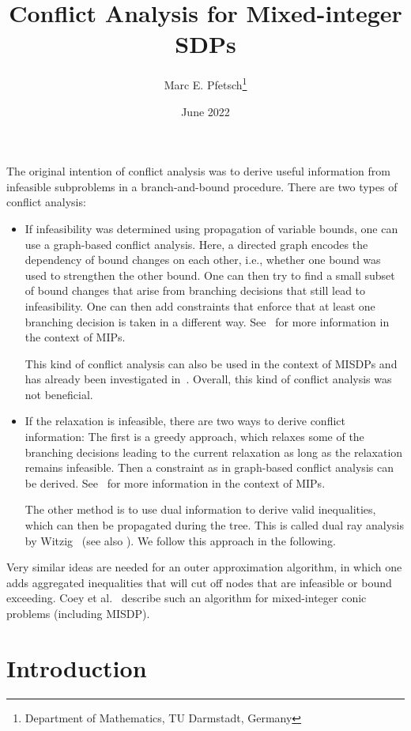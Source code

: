 \documentclass[10pt, a4paper]{article}
\title{Conflict Analysis for Mixed-integer SDPs}
\author{Marc E. Pfetsch\thanks{Department of Mathematics, TU Darmstadt, Germany}}
\date{June 2022}
\begin{document}
\maketitle

The original intention of conflict analysis was to derive useful
information from infeasible subproblems in a branch-and-bound
procedure. There are two types of conflict analysis:
\begin{itemize}
\item If infeasibility was determined using propagation of variable bounds,
  one can use a graph-based conflict analysis. Here, a directed graph
  encodes the dependency of bound changes on each other, i.e., whether one
  bound was used to strengthen the other bound. One can then try to find a
  small subset of bound changes that arise from branching decisions that
  still lead to infeasibility. One can then add constraints that enforce
  that at least one branching decision is taken in a different
  way. See~\cite{Ach07b,Ach07} for more information in the context of MIPs.

  This kind of conflict analysis can also be used in the context of MISDPs
  and has already been investigated in~\cite{MatP22}. Overall, this kind of
  conflict analysis was not beneficial.
\item If the relaxation is infeasible, there are two ways to derive
  conflict information: The first is a greedy approach, which relaxes some
  of the branching decisions leading to the current relaxation as long as
  the relaxation remains infeasible. Then a constraint as in graph-based
  conflict analysis can be derived. See~\cite{Ach07b,Ach07} for more
  information in the context of MIPs.

  The other method is to use dual information to derive valid inequalities,
  which can then be propagated during the tree. This is called dual ray
  analysis by Witzig~\cite{Wit22} (see also \cite{WitBH17}). We follow this
  approach in the following.
\end{itemize}

Very similar ideas are needed for an outer approximation algorithm, in
which one adds aggregated inequalities that will cut off nodes that are
infeasible or bound exceeding. Coey et al.~\cite{CoeLV20} describe such an
algorithm for mixed-integer conic problems (including MISDP).



\section{Introduction}
\end{document}
